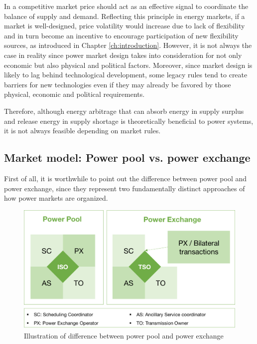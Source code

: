 In a competitive market price should act as an effective signal to coordinate the balance of supply and demand. Reflecting this principle in energy markets, if a market is well-designed, price volatility would increase due to lack of flexibility and in turn become an incentive to encourage participation of new flexibility sources, as introduced in Chapter \ref{ch:introduction}. However, it is not always the case in reality since power market design takes into consideration for not only economic but also physical and political factors. Moreover, since market design is likely to lag behind technological development, some legacy rules tend to create barriers for new technologies even if they may already be favored by those physical, economic and political requirements.

Therefore, although energy arbitrage that can absorb energy in supply surplus and release energy in supply shortage is theoretically beneficial to power systems, it is not always feasible depending on market rules. 

\subsection{Market model: Power pool vs. power exchange}

First of all, it is worthwhile to point out the difference between power pool and power exchange, since they represent two fundamentally distinct approaches of how power markets are organized. 

\begin{figure}[h!]
	\centering
	\includegraphics[width=0.95\linewidth]{Figures/PowerPoolExchange}
	\caption{Illustration of difference between power pool and power exchange}
	\label{fig:pppx}
\end{figure}

